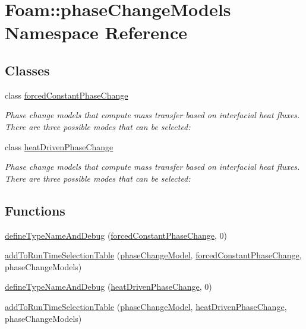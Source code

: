 \hypertarget{namespaceFoam_1_1phaseChangeModels}{}\section{Foam\+:\+:phase\+Change\+Models Namespace Reference}
\label{namespaceFoam_1_1phaseChangeModels}
\subsection*{Classes}
\begin{DoxyCompactItemize}
\item 
class \hyperlink{classFoam_1_1phaseChangeModels_1_1forcedConstantPhaseChange}{forced\+Constant\+Phase\+Change}
\begin{DoxyCompactList}\small\item\em Phase change models that compute mass transfer based on interfacial heat fluxes. There are three possible modes that can be selected\+: \end{DoxyCompactList}\item 
class \hyperlink{classFoam_1_1phaseChangeModels_1_1heatDrivenPhaseChange}{heat\+Driven\+Phase\+Change}
\begin{DoxyCompactList}\small\item\em Phase change models that compute mass transfer based on interfacial heat fluxes. There are three possible modes that can be selected\+: \end{DoxyCompactList}\end{DoxyCompactItemize}
\subsection*{Functions}
\begin{DoxyCompactItemize}
\item 
\hyperlink{namespaceFoam_1_1phaseChangeModels_a3ab3a62ddc69c6b520ef8ff616515733}{define\+Type\+Name\+And\+Debug} (\hyperlink{classFoam_1_1phaseChangeModels_1_1forcedConstantPhaseChange}{forced\+Constant\+Phase\+Change}, 0)
\item 
\hyperlink{namespaceFoam_1_1phaseChangeModels_a94d7cb9ce316dd857faa3c8e485c809c}{add\+To\+Run\+Time\+Selection\+Table} (\hyperlink{classFoam_1_1phaseChangeModel}{phase\+Change\+Model}, \hyperlink{classFoam_1_1phaseChangeModels_1_1forcedConstantPhaseChange}{forced\+Constant\+Phase\+Change}, phase\+Change\+Models)
\item 
\hyperlink{namespaceFoam_1_1phaseChangeModels_a2ab6ce8506ae017d6165eeb5d1016cc7}{define\+Type\+Name\+And\+Debug} (\hyperlink{classFoam_1_1phaseChangeModels_1_1heatDrivenPhaseChange}{heat\+Driven\+Phase\+Change}, 0)
\item 
\hyperlink{namespaceFoam_1_1phaseChangeModels_a6e2a1715c7ec5a03843dda857452e83a}{add\+To\+Run\+Time\+Selection\+Table} (\hyperlink{classFoam_1_1phaseChangeModel}{phase\+Change\+Model}, \hyperlink{classFoam_1_1phaseChangeModels_1_1heatDrivenPhaseChange}{heat\+Driven\+Phase\+Change}, phase\+Change\+Models)
\end{DoxyCompactItemize}


